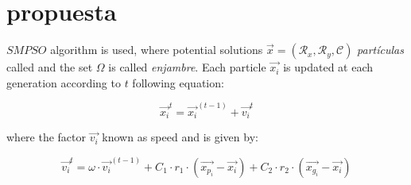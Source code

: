 \documentclass[spanish,twocolumn]{article}
\begin{document}
\section{propuesta}
\label{sec:propuesta}

$SMPSO$ \cite{4938830} algorithm is used, where potential solutions $\overrightarrow{x}=(\mathcal{R}_x, \mathcal{R}_y, \mathcal{C})$ {\it partículas} called and the set $\Omega$ is called {\it enjambre}. Each particle $\overrightarrow{x_i}$ is updated at each generation according to $t$ following equation:

\begin{equation}\label{eq:psobasico}
\overrightarrow{x_i}^t = \overrightarrow{x_i}^{(t-1)} + \overrightarrow{v_i}^t
\end{equation}

where the factor $\overrightarrow{v_i}$ known as speed and is given by:

\begin{equation}\label{eq:psobasico2}
\overrightarrow{v_i}^t = \omega \cdot \overrightarrow{v_i}^{(t-1)} + C_1 \cdot r_1 \cdot (\overrightarrow{x_{p_i}}-\overrightarrow{x_i}) + C_2 \cdot r_2 \cdot (\overrightarrow{x_{g_i}}-\overrightarrow{x_i})
\end{equation}
\end{document}
